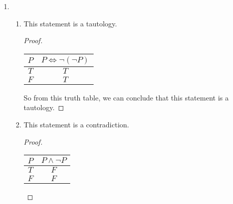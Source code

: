 \documentclass{article}
\begin{document}
\begin{enumerate}
\begin{enumerate}
\begin{proof}
                So from this truth table, we can conclude that these two expressions are logically equivalent.
            \end{proof}
            \item 
            This two expressions are logically equivalent.
            \begin{proof}
                \begin{tabular}{c|c|c} $P$ $Q$ $R$ & $P \Rightarrow (Q \wedge R)$ & $(P \Rightarrow Q) \wedge (P \Rightarrow R)$\\\hline
                    $T$ $T$ $T$ & $T$ & $T$\\
                    $T$ $T$ $F$ & $F$ & $F$\\
                    $T$ $F$ $T$ & $F$ & $F$\\
                    $T$ $F$ $F$ & $F$ & $F$\\
                    $F$ $T$ $T$ & $T$ & $T$\\
                    $F$ $T$ $F$ & $T$ & $T$\\
                    $F$ $F$ $T$ & $T$ & $T$\\
                    $F$ $F$ $F$ & $T$ & $T$\\
                \end{tabular}

                So from this truth table, we can conclude that these two expressions are logically equivalent.
            \end{proof}
        \end{enumerate}

        \item 
        \begin{enumerate}
            \item 
            This statement is a tautology.
            \begin{proof}
                \begin{tabular}{c|c} $P$ & $P \Leftrightarrow \neg(\neg P)$\\\hline
                    $T$ & $T$\\
                    $F$ & $T$\\
                \end{tabular}

                So from this truth table, we can conclude that this statement is a tautology.
            \end{proof}
            \item 
            This statement is a contradiction.
            \begin{proof}
                \begin{tabular}{c|c} $P$ & $P \wedge \neg P$\\\hline
                    $T$ & $F$\\
                    $F$ & $F$\\
                \end{tabular}


\end{proof}
\end{enumerate}
\end{enumerate}
\end{document}
